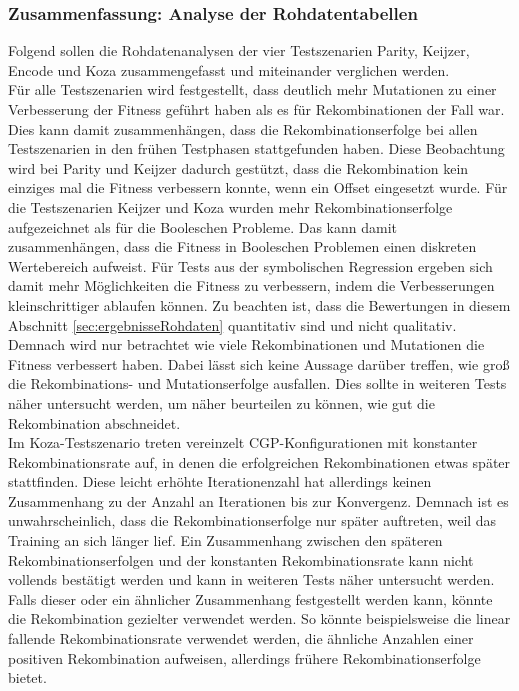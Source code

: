 \subsubsection{Zusammenfassung: Analyse der Rohdatentabellen}
Folgend sollen die Rohdatenanalysen der vier Testszenarien Parity, Keijzer, Encode und Koza zusammengefasst und miteinander verglichen werden.\\
Für alle Testszenarien wird festgestellt, dass deutlich mehr Mutationen zu einer Verbesserung der Fitness geführt haben als es für Rekombinationen der Fall war.
Dies kann damit zusammenhängen, dass die Rekombinationserfolge bei allen Testszenarien in den frühen Testphasen stattgefunden haben.
Diese Beobachtung wird bei Parity und Keijzer dadurch gestützt, dass die Rekombination kein einziges mal die Fitness verbessern konnte, wenn ein Offset eingesetzt wurde.
Für die Testszenarien Keijzer und Koza wurden mehr Rekombinationserfolge aufgezeichnet als für die Booleschen Probleme.
Das kann damit zusammenhängen, dass die Fitness in Booleschen Problemen einen diskreten Wertebereich aufweist.
Für Tests aus der symbolischen Regression ergeben sich damit mehr Möglichkeiten die Fitness zu verbessern, indem die Verbesserungen kleinschrittiger ablaufen können.
Zu beachten ist, dass die Bewertungen in diesem Abschnitt \ref{sec:ergebnisseRohdaten} quantitativ sind und nicht qualitativ.
Demnach wird nur betrachtet wie viele Rekombinationen und Mutationen die Fitness verbessert haben.
Dabei lässt sich keine Aussage darüber treffen, wie groß die Rekombinations- und Mutationserfolge ausfallen.
Dies sollte in weiteren Tests näher untersucht werden, um näher beurteilen zu können, wie gut die Rekombination abschneidet.\\
Im Koza-Testszenario treten vereinzelt CGP-Konfigurationen mit konstanter Rekombinationsrate auf, in denen die erfolgreichen Rekombinationen etwas später stattfinden.
Diese leicht erhöhte Iterationenzahl hat allerdings keinen Zusammenhang zu der Anzahl an Iterationen bis zur Konvergenz.
Demnach ist es unwahrscheinlich, dass die Rekombinationserfolge nur später auftreten, weil das Training an sich länger lief.
Ein Zusammenhang zwischen den späteren Rekombinationserfolgen und der konstanten Rekombinationsrate kann nicht vollends bestätigt werden und kann in weiteren Tests näher untersucht werden.
Falls dieser oder ein ähnlicher Zusammenhang festgestellt werden kann, könnte die Rekombination gezielter verwendet werden.
So könnte beispielsweise die linear fallende Rekombinationsrate verwendet werden, die ähnliche Anzahlen einer positiven Rekombination aufweisen, allerdings frühere Rekombinationserfolge bietet.
